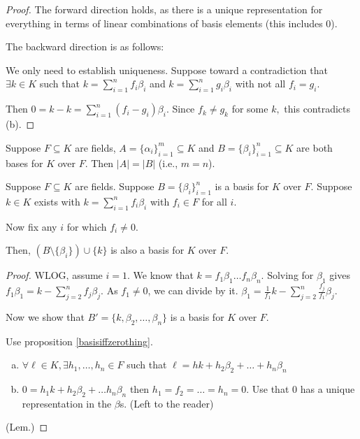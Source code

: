 \documentclass[notes.tex]{subfiles}
\begin{document}
\begin{proof}
	The forward direction holds, as there is a unique representation for everything in terms of linear combinations of basis elements (this includes 0).

	The backward direction is as follows:

	We only need to establish uniqueness. Suppose toward a contradiction that $\exists k\in K$ such that $k = \sum_{i=1}^nf_i\beta_i$ and $k =\sum_{i=1}^ng_i\beta_i $ with not all $f_i = g_i$.

	Then $0 = k-k = \sum_{i=1}^n(f_i - g_i)\beta_i$. Since $f_k\ne g_k$ for some $k,$ this contradicts (b).
\end{proof}

\begin{theorem}
	\label{thm:basisdim}
	Suppose $F\subseteq K$ are fields, $A = \{\alpha_i\}_{i=1}^m\subseteq K$
	and $B = \{\beta_i\}_{i=1}^n \subseteq K$ are both bases for $K$ over $F$. Then $|A| = |B|$ (i.e., $m = n$).
\end{theorem}

\begin{lemma}
	\label{lem:switcheroo}
	Suppose $F\subseteq K$ are fields. Suppose $B = \{\beta_i\}_{i=1}^n$ is a basis for $K$ over $F$. Suppose $k\in K$ exists with $k = \sum_{i=1}^nf_i \beta_i$ with $f_i\in F$ for all $i$.

	Now fix any $i$ for which $f_i\ne 0$.
	
	Then, $(B\setminus\{\beta_i\})\cup\{k\}$ is also a basis for $K$ over $F$.
\end{lemma}
\begin{proof}
	WLOG, assume $i=1$.
	We know that $k = f_1 \beta_1\ldots f_n \beta_n$.
	Solving for $\beta_1$ gives $f_1 \beta_1 = k - \sum_{j=2}^nf_j \beta_j$. As $f_1\ne 0$, we can divide by it.
	$\beta_1 = \frac{1}{f_1}k - \sum_{j=2}^n\frac{f_j}{f_1} \beta_j$.

	Now we show that $B' = \{k, \beta_2, \ldots, \beta_n\}$ is a basis for $K$ over $F$.

	Use proposition \ref{basisiffzerothing}.
	\begin{enumerate}[(a)]
		\item $\forall \ell\in K, \exists h_1, \ldots, h_n\in F$ such that $\ell = hk + h_2 \beta_2 + \ldots + h_n \beta_n$
		\item $0=h_1k + h_2 \beta_2 + \ldots h_n \beta_n$ then $h_1 = f_2 = \ldots = h_n = 0$. Use that $0$ has a unique representation in the $\beta$s. (Left to the reader)
	\end{enumerate}
	\qedhere(Lem.)
\end{proof}
\end{document}
